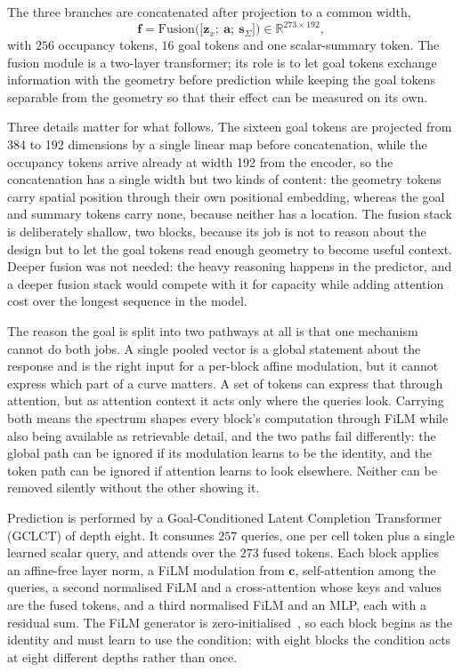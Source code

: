 \documentclass[pdflatex,oneside,sn-mathphys-num]{sn-jnl}
\theoremstyle{thmstyleone}
\theoremstyle{thmstyletwo}
\theoremstyle{thmstylethree}
\begin{document}
The three branches are concatenated after projection to a common width,
\begin{equation}
\mathbf{f}=\mathrm{Fusion}\big([\mathbf{z}_x;\ \mathbf{a};\ \mathbf{s}_\Sigma\big])
\in\mathbb{R}^{273\times192},
\end{equation}
with $256$ occupancy tokens, $16$ goal tokens and one scalar-summary token. The fusion
module is a two-layer transformer; its role is to let goal tokens exchange information
with the geometry before prediction while keeping the goal tokens separable from the geometry so that their effect can be
measured on its own.

Three details matter for what follows. The sixteen goal tokens are projected from 384 to
192 dimensions by a single linear map before concatenation, while the occupancy tokens
arrive already at width 192 from the encoder, so the concatenation has a single width but two kinds of content: the geometry tokens carry
spatial position through their own positional embedding, whereas the goal and summary tokens
carry none, because neither has a location. The fusion stack is deliberately shallow, two blocks, because
its job is not to reason about the design but to let the goal tokens read enough geometry
to become useful context. Deeper fusion was not needed: the heavy reasoning happens in
the predictor, and a deeper fusion stack would compete with it for capacity while adding
attention cost over the longest sequence in the model.

The reason the goal is split into two pathways at all is that one mechanism cannot do both
jobs. A single pooled vector is a global statement about the response and is the right
input for a per-block affine modulation, but it cannot express which part of a curve
matters. A set of tokens can express that through attention, but as attention context it
acts only where the queries look. Carrying both means the spectrum shapes every block's
computation through FiLM while also being available as retrievable detail, and the two
paths fail differently: the global path can be ignored if its modulation learns to be the
identity, and the token path can be ignored if attention learns to look elsewhere. Neither
can be removed silently without the other showing it.

Prediction is performed by a Goal-Conditioned Latent Completion Transformer (GCLCT) of
depth eight. It consumes $257$ queries, one per cell token plus a single learned
scalar query, and attends over the $273$ fused tokens. Each block applies an
affine-free layer norm, a FiLM modulation from $\mathbf{c}$, self-attention among the
queries, a second normalised FiLM and a cross-attention whose keys and values are the
fused tokens, and a third normalised FiLM and an MLP, each with a residual sum. The
FiLM generator is zero-initialised~\cite{dit}, so each block begins as the identity and
must learn to use the condition; with eight blocks the condition acts at eight
different depths rather than once.
\end{document}
